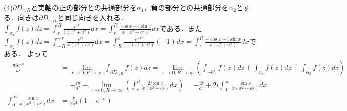 \documentclass[
		book,
		head_space=20mm,
		foot_space=20mm,
		gutter=10mm,
		line_length=190mm
]{jlreq}
\begin{document}
(4)$\partial D_{r,R}$と実軸の正の部分との共通部分を$\alpha_1$，負の部分との共通部分を$\alpha_2$とする．向きは$\partial D_{r,R}$と同じ向きを入れる．$\int_{\alpha_1}f(z)dz=\int_r^R \frac{e^{ix}}{x(x^2+a^2)}dx=\int_r^R \frac{\cos x+i\sin x}{x(x^2+a^2)}dx$である．また$\int_{\alpha_2}f(z)dz=\int_{-R}^{-r} \frac{e^{ix}}{x(x^2+a^2)}dx=\int_{R}^{r} \frac{e^{-ix}}{-x(x^2+a^2)}(-1)dx=\int_{r}^{R} \frac{-\cos x+i\sin x}{x(x^2+a^2)}dx$である．
よって
\begin{align}
    -\frac{\pi ie^{-a}}{a^2} &= \lim\limits_{r\to 0,R\to \infty}\int_{\partial D_{r,R}}f(z)dz=\lim\limits_{r\to 0,R\to \infty} \left( \int_{-C_r}f(z)dz+\int_{\alpha_1}f(z)dz+\int_{\alpha_2}f(z)dz \right)\\
&=-\frac{i\pi}{a^2}+\lim\limits_{r\to 0,R\to \infty} \left( \int_{r}^{R} \frac{2i\sin x}{x(x^2+a^2)}dx \right)
=-\frac{i\pi}{a^2}+2i\int_{0}^{\infty} \frac{\sin x}{x(x^2+a^2)}dx\\
\int_{0}^{\infty} \frac{\sin x}{x(x^2+a^2)}dx&=\frac{\pi}{2a^2}(1-e^{-a})
\end{align}
\end{document}
